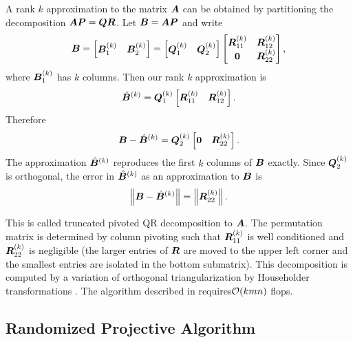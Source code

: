 \documentclass[12pt]{article}
\newcommand{\matrice}[1]{\begin{bmatrix}#1\end{bmatrix}}
\begin{document}
A rank $k$ approximation to the matrix $\bm{A}$ can be obtained by partitioning
the decomposition $\bm{AP}=\bm{QR}$. Let $\bm{B}=\bm{AP}$ and write
\[
\mtx{B}=\matrice{\mtx{B}_{1}^{(k)} & \mtx{B}_{2}^{(k)}}=\matrice{\mtx{Q}_{1}^{(k)} & \mtx{Q}_{2}^{(k)}}\matrice{
\mtx{R}_{11}^{(k)} & \mtx{R}_{12}^{(k)}\\
\mtx{0} & \mtx{R}_{22}^{(k)}},
\]
where $\bm{B}_{1}^{(k)}$ has $k$ columns. Then our rank $k$ approximation is 
\begin{eqnarray*}
\hat{\bm{B}}^{(k)} = \bm{Q}_{1}^{(k)}\left[\bm{R}_{11}^{(k)}~~~\bm{R}_{12}^{(k)}\right].
\end{eqnarray*}
Therefore 
\begin{eqnarray*}
\bm{B}-\hat{\bm{B}}^{(k)}=\bm{Q}_{2}^{(k)}\left[\bm{0}~~~\bm{R}_{22}^{(k)}\right].
\end{eqnarray*}
The approximation $\hat{\bm{B}}^{(k)}$ reproduces the first $k$ columns
of $\bm{B}$ exactly. Since $\bm{Q}_{2}^{(k)}$ is orthogonal, the error in
$\hat{\bm{B}}^{(k)}$ as an approximation to $\bm{B}$ is 
\begin{eqnarray}
\left\Vert {\bm{B}-\hat{\bm{B}}^{(k)}} \right\Vert = \left\Vert {\bm{R}_{22}^{(k)}} \right\Vert.
\label{eq:tpqrf}
\end{eqnarray}


This is called truncated pivoted QR decomposition to $\bm{A}$. The permutation matrix is determined by column pivoting such that $\bm{R}_{11}^{(k)}$ is well conditioned and $\bm{R}_{22}^{(k)}$ is negligible (the larger entries of $\bm{R}$ are moved to the upper left corner and the smallest entries are isolated in the bottom submatrix).
This decomposition is computed by a variation of orthogonal triangularization by Householder transformations \cite{golubvan,Stewartbook}. The algorithm described in \cite{golubvan,Stewartbook} requires$\mathcal{O}(kmn)$ flops.

\subsection{Randomized Projective Algorithm}
\label{sec:intuition}
\end{document}

